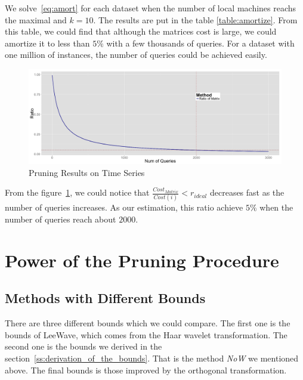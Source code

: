 We solve~\eqref{eq:amort} for each dataset when the number of local machines reachs the maximal and $k=10$.  The results are put in the table \ref{table:amortize}.  From this table, we could find that although the matrices cost is large, we could amortize it to less than $5\%$ with a few thousands of queries.  For a dataset with one million of instances, the number of queries could be achieved easily.  


\begin{figure}[htpb!]
  \centering
  \includegraphics[width=1.0\linewidth]{exp/AQ/ANN.png}
  \caption{Pruning Results on Time Series}
  \label{fig:AQ}
\end{figure}

From the figure~\ref{fig:AQ}, we could notice that $\frac{Cost_{Matrix}}{Cost(i)} < r_{ideal}$ decreases fast as the number of queries increases.  As our estimation, this ratio achieve $5\%$ when the number of queries reach about $2000$.







\section{Power of the Pruning Procedure} %
\label{s:power_of_the_pruning_procedure}

\subsection{Methods with Different Bounds} %
\label{sub:methods_with_different_bounds}


There are three different bounds which we could compare.  The first one is the bounds of LeeWave, which comes from the Haar wavelet transformation.  The second one is the bounds we derived in the section~\ref{ss:derivation_of_the_bounds}.  That is the method \emph{NoW} we mentioned above.  The final bounds is those improved by the orthogonal transformation.


